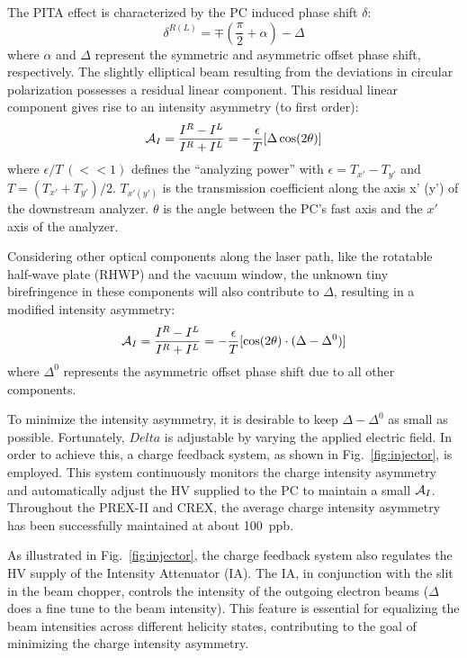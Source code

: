 The PITA effect is characterized by the PC induced phase shift $\delta$:
\begin{equation}
    \delta^{R(L)} = \mp\left(\frac{\pi}{2} + \alpha \right) - \Delta
\end{equation}
where $\alpha$ and $\Delta$ represent the symmetric and asymmetric offset phase
shift, respectively. The slightly elliptical beam resulting from the deviations in circular polarization possesses a residual linear component. This residual linear component gives rise to an intensity asymmetry (to first order):
\begin{equation}
    \mathcal{A}_{I} = \frac{I^R - I^L}{I^R + I^L} = -\frac{\epsilon}{T}[\Delta\cos(2\theta)]
\end{equation}
where $\epsilon/T \ (<<1)$ defines the ``analyzing power'' with $\epsilon = T_{x'} - T_{y'}$ 
and $T = (T_{x'} + T_{y'})/2$.
$T_{x' (y')}$ is the transmission coefficient along the axis x' (y') of the
downstream analyzer. $\theta$ is the angle between the PC's fast axis and the 
$x'$ axis of the analyzer.

Considering other optical components along the laser path, like the rotatable half-wave plate 
(RHWP) and the vacuum window, the unknown tiny birefringence in these components will also 
contribute to $\Delta$, resulting in a modified intensity asymmetry:
\begin{equation}
    \mathcal{A}_{I} = \frac{I^R - I^L}{I^R + I^L} = -\frac{\epsilon}{T}[\cos(2\theta)\cdot(\Delta - \Delta^0)]	\\
\end{equation}
where $\Delta^0$ represents the asymmetric offset phase shift due to all other components.

To minimize the intensity asymmetry, it is desirable to keep $\Delta - \Delta^0$
as small as possible. Fortunately, $Delta$ is adjustable by varying the applied
electric field. In order to achieve this, a charge feedback system, as shown in Fig.~\ref{fig:injector}, 
is employed. This system continuously monitors the charge intensity asymmetry and automatically adjust the HV 
supplied to the PC to maintain a small $\mathcal{A}_I$. Throughout the PREX-II and CREX, 
the average charge intensity asymmetry has been successfully maintained at about 100~ppb.

As illustrated in Fig.~\ref{fig:injector}, the charge feedback system also
regulates the HV supply of the Intensity Attenuator (IA). The IA, in conjunction with
the slit in the beam chopper, controls the intensity of the outgoing electron beams
($\Delta$ does a fine tune to the beam intensity). This feature is essential for equalizing the beam intensities across different helicity states, contributing to the goal of minimizing the charge intensity asymmetry.

